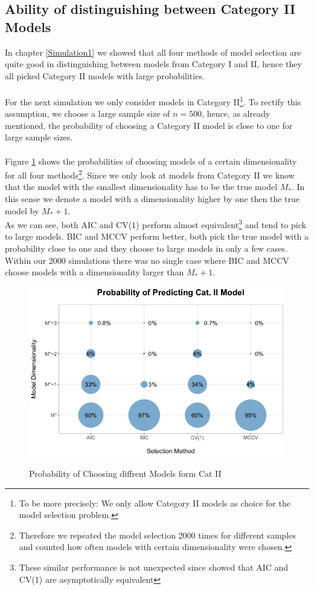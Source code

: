 \documentclass[Research_Module_ES.tex]{subfiles}
\begin{document}
\subsection{Ability of distinguishing  between Category II Models}
In chapter \ref{Simulation1} we showed that all four methods of model selection are quite good in distinguishing between models from Category I and II, hence they all picked Category II models with large probabilities. \\
\\
For the next simulation we only consider models in Category II\footnote{To be more precisely: We only allow Category II models as choice for the model selection problem.}. To rectify this assumption, we choose a large sample size of $n=500$, hence, as already mentioned, the probability of choosing a Category II model is close to one for large sample sizes.\\
\\
Figure \ref{Simulation2} shows the probabilities of choosing models of a certain dimensionality for all four methods\footnote{Therefore we repeated the model selection 2000 times for different samples and counted how often models with certain dimensionality were chosen.}. Since we only look at models from Category II we know that the model with the smallest dimensionality has to be the true model $M_\ast$. In this sense we denote a model with a dimensionality higher by one then the true model by $M_\ast+1$.\\
As we can see, both AIC and CV(1) perform almost equivalent\footnote{These similar performance is not unexpected since \cite{stone1977asymptotic} showed that AIC and CV(1) are asymptotically equivalent} and tend to pick to large models. BIC and MCCV  perform better, both pick the true model with a probability close to one and they choose to large models in only a few cases. Within our 2000 simulations there was no single case where BIC and MCCV choose models with a dimensionality larger than $M_\ast+1$.
\begin{figure}[!h]
	\label{Simulation2}
	\centering
	\includegraphics[width=1\textwidth]{Simulation2.png}\\
	\caption{Probability of Choosing diffrent Models form Cat II}
\end{figure}
\end{document}
